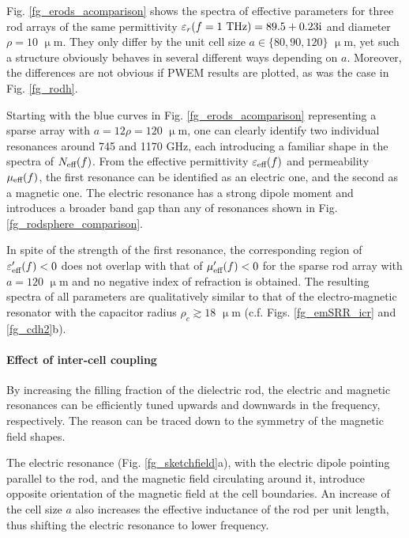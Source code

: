 Fig. \ref{fg_erods_acomparison} shows the spectra of effective parameters for three rod arrays of the same permittivity $\varepsilon_r(f=1\text{ THz}) = 89.5+0.23{\mathrm i}$ and diameter $\rho=10$ $\upmu$m. They only differ by the unit cell size $a \in \{80, 90, 120\}$ $\upmu$m, yet such a structure obviously behaves in several different ways depending on $a$. Moreover, the differences are not obvious if PWEM results are plotted, as was the case in Fig. \ref{fg_rodh}.  

Starting with the blue curves in Fig. \ref{fg_erods_acomparison} representing a sparse array with $a=12\rho = 120$ $\upmu$m, one can clearly identify two individual resonances around 745 and 1170 GHz, each introducing a familiar shape in the spectra of $N_{\text{eff} }(f)$. From the effective permittivity $\varepsilon_{\text{eff} }(f)$ and permeability $\mu_{\text{eff} }(f)$, the first resonance can be identified as an electric one, and the second as a magnetic one. The electric resonance has a strong dipole moment and introduces a broader band gap than any of resonances shown in Fig. \ref{fg_rodsphere_comparison}. %

In spite of the strength of the first resonance, the corresponding region of $\varepsilon_{\text{eff} }'(f)<0$ does not overlap with that of $\mu_{\text{eff} }'(f)<0$ for the sparse rod array with $a=120$ $\upmu$m and no negative index of refraction is obtained. The resulting spectra of all parameters are qualitatively similar to that of the electro-magnetic resonator with the capacitor radius $\rho_c\gtrsim 18$ $\upmu$m  (c.f. Figs. \ref{fg_emSRR_icr} and \ref{fg_cdh2}b).

\paragraph{Effect of inter-cell coupling}%
By increasing the filling fraction of the dielectric rod, the electric and magnetic resonances can be efficiently tuned upwards and downwards in the frequency, respectively. 
The reason can be traced down to the symmetry of the magnetic field shapes. 

The electric resonance (Fig. \ref{fg_sketchfield}a), with the electric dipole pointing parallel to the rod, and the magnetic field circulating around it, introduce opposite orientation of the magnetic field at the cell boundaries. An increase of the cell size $a$ also increases the effective inductance of the rod per unit length, thus shifting the electric resonance to lower frequency.

